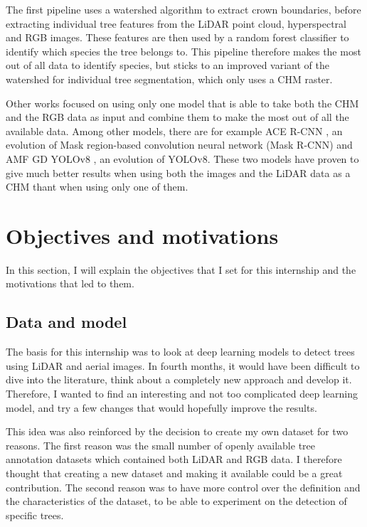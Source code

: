 \documentclass[
]{report}
\begin{document}
The first pipeline \autocite{lidar_rgb_wst} uses a watershed algorithm
to extract crown boundaries, before extracting individual tree features
from the LiDAR point cloud, hyperspectral and RGB images. These features
are then used by a random forest classifier to identify which species
the tree belongs to. This pipeline therefore makes the most out of all
data to identify species, but sticks to an improved variant of the
watershed for individual tree segmentation, which only uses a CHM
raster.

Other works focused on using only one model that is able to take both
the CHM and the RGB data as input and combine them to make the most out
of all the available data. Among other models, there are for example ACE
R-CNN \autocite{lidar_rgb_acnet}, an evolution of Mask region-based
convolution neural network (Mask R-CNN) and AMF GD YOLOv8
\autocite{amf_gd_yolov8}, an evolution of YOLOv8. These two models have
proven to give much better results when using both the images and the
LiDAR data as a CHM thant when using only one of them.

\chapter{Objectives and motivations}\label{objectives-and-motivations}

In this section, I will explain the objectives that I set for this
internship and the motivations that led to them.

\section{Data and model}\label{data-and-model}

The basis for this internship was to look at deep learning models to
detect trees using LiDAR and aerial images. In fourth months, it would
have been difficult to dive into the literature, think about a
completely new approach and develop it. Therefore, I wanted to find an
interesting and not too complicated deep learning model, and try a few
changes that would hopefully improve the results.

This idea was also reinforced by the decision to create my own dataset
for two reasons. The first reason was the small number of openly
available tree annotation datasets which contained both LiDAR and RGB
data. I therefore thought that creating a new dataset and making it
available could be a great contribution. The second reason was to have
more control over the definition and the characteristics of the dataset,
to be able to experiment on the detection of specific trees.
\end{document}
